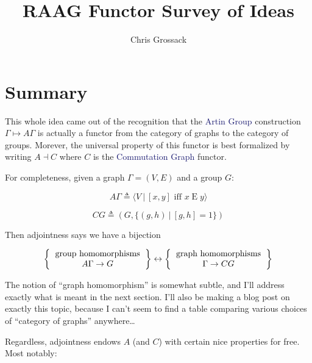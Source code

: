 \documentclass[12pt]{article}
\author{Chris Grossack}
\title{RAAG Functor Survey of Ideas}
\theoremstyle{definition}
\newcommand{\teq}{\triangleq}
\newcommand*{\important}[1]{\textcolor{MidnightBlue}{#1}}
\begin{document}
\maketitle

\section{Summary}

This whole idea came out of the recognition that the 
\important{Artin Group} construction $\Gamma \mapsto A \Gamma$ 
is actually a functor 
from the category of graphs to the category of groups. Morever,
the universal property of this functor is best formalized by writing 
$A \dashv C$ where $C$ is the \important{Commutation Graph} functor. 

For completeness, given a graph $\Gamma = (V,E)$ and a group $G$:

\[ A\Gamma \teq \langle V ~|~ [x,y] \text{ iff } x \mathrel{E} y \rangle \]

\[ CG \teq (G, \{ (g,h) ~|~ [g,h] = 1 \}) \]

Then adjointness says we have a bijection

\[ 
  \left \{ 
  \begin{tabular}{c} 
    group homomorphisms\\ 
    $A\Gamma \to G$
  \end{tabular} 
  \right \} 
  \leftrightarrow
  \left \{ 
  \begin{tabular}{c} 
    graph homomorphisms\\ 
    $\Gamma \to CG$
  \end{tabular} 
  \right \} 
\]
  
The notion of ``graph homomorphism'' is somewhat subtle, and I'll address 
exactly what is meant in the next section. I'll also be making a blog post
on exactly this topic, because I can't seem to find a table comparing various
choices of ``category of graphs'' anywhere\ldots

Regardless, adjointness endows $A$ (and $C$) with certain nice properties for
free. Most notably:
\end{document}

